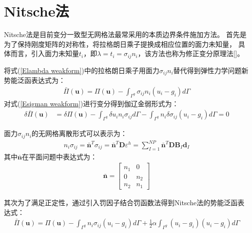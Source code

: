 \section{Nitsche法}
Nitsche法\cite{}是目前变分一致型无网格法最常采用的本质边界条件施加方法。
首先是为了保持刚度矩阵的对称性，将拉格朗日乘子提换成相应位置的面力未知量，
具体而言，引入面力未知量$t_i$，即$\lambda=t_i=\sigma_{ij}n_i$，该方法也称为修正变分原理法[]。\par
将式(\ref{Elambda weakform})中的拉格朗日乘子用面力$\sigma_{ij}n_i$替代得到弹性力学问题新势能泛函表达式为：
\begin{equation}
\begin{split}\label{Esigman weakform}
    \bar{\Pi}(\pmb{u})=\Pi(\pmb{u})-\int_{\Gamma^g}\sigma_{ij}n_i(u_i-g_i)d\Gamma
\end{split}
\end{equation}
对式(\ref{Esigman weakform})进行变分得到伽辽金弱形式为：
\begin{equation}
\begin{split}
    \delta\bar{\Pi}(\pmb{u})&=\delta\Pi(\pmb{u})-\int_{\Gamma^g}\delta u_in_i\sigma_{ij}d\Gamma-\int_{\Gamma^g}n_i\delta\sigma_{ij}(u_i-g_i)d\Gamma
    =0
\end{split}
\end{equation}\par
面力$\sigma_{ij}n_i$的无网格离散形式可以表示为：
\begin{equation}\label{Esigman wuwanggelisan}
\begin{split}
    n_i\sigma_{ij}=\bar{\pmb n}^T\sigma_{ij}=\bar{\pmb n}^T\pmb{D}\varepsilon^h=\sum_{I=1}^{N\!P}\bar{\pmb n}^T\pmb{D}\pmb{B}_I\pmb{d}_I
\end{split}
\end{equation}
其中$\bar{\pmb{n}}$在平面问题中表达式为：
\begin{equation}
\begin{split}
    \bar{\pmb n}=\left[\begin{matrix}n_1&0\\0&n_2\\n_2&n_1
    \end{matrix}\right]
\end{split}
\end{equation}\par
其次为了满足正定性，通过引入罚因子结合罚函数法得到Nitsche法的势能泛函表达式：
\begin{equation}\label{Enitsche weakform}
\begin{split}
    \bar{\Pi}(\pmb{u})=\Pi(\pmb{u})-\int_{\Gamma^g}n_i\sigma_{ij}(u_i-g_i)d\Gamma+\frac{1}{2}\alpha\int_{\Gamma^g}(u_i-g_i)(u_i-g_i)d\Gamma
\end{split}
\end{equation}
